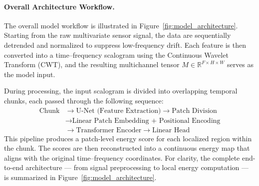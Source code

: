 \documentclass{article}
\begin{document}
\paragraph{Overall Architecture Workflow.}

The overall model workflow is illustrated in Figure~\ref{fig:model_architecture}.
Starting from the raw multivariate sensor signal, the data are sequentially detrended and normalized to suppress low-frequency drift. 
Each feature is then converted into a time–frequency scalogram using the Continuous Wavelet Transform (CWT), and the resulting multichannel tensor 
$M \in \mathbb{R}^{F \times H \times W}$ serves as the model input.

During processing, the input scalogram is divided into overlapping temporal chunks, each passed through the following sequence:
\[
\begin{aligned}
\text{Chunk} & \rightarrow \text{U-Net (Feature Extraction)} \rightarrow \text{Patch Division} \\
& \rightarrow \text{Linear Patch Embedding + Positional Encoding} \\
& \rightarrow \text{Transformer Encoder} \rightarrow \text{Linear Head}
\end{aligned}
\]
This pipeline produces a patch-level energy score for each localized region within the chunk. 
The scores are then reconstructed into a continuous energy map that aligns with the original time–frequency coordinates. 
For clarity, the complete end-to-end architecture — from signal preprocessing to local energy computation — is summarized in Figure~\ref{fig:model_architecture}. 
\end{document}
